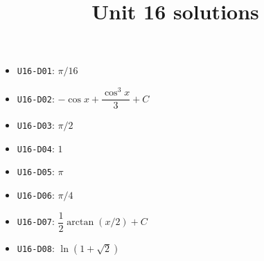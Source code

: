 
\title{Unit 16 solutions}

\maketitle
\begin{itemize}
  \item \texttt{U16-D01}: $\pi/16$
  \item \texttt{U16-D02}: $-\cos x+\dfrac{\cos^{3}x}{3}+C$
  \item \texttt{U16-D03}: $\pi/2$
  \item \texttt{U16-D04}: $1$
  \item \texttt{U16-D05}: $\pi$
  \item \texttt{U16-D06}: $\pi/4$
  \item \texttt{U16-D07}: $\dfrac{1}{2}\arctan(x/2)+C$
  \item \texttt{U16-D08}: $\ln(1+\sqrt{2})$
\end{itemize}

